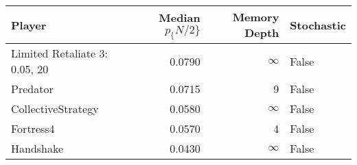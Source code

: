 \begin{tabular}{lrrl}
\toprule
                        Player &  Median $p_\{N/2\}$ &  Memory Depth & Stochastic \\
\midrule
 Limited Retaliate 3: 0.05, 20 &            0.0790 &            \(\infty\) &      False \\
                      Predator &            0.0715 &             9 &      False \\
            CollectiveStrategy &            0.0580 &            \(\infty\) &      False \\
                     Fortress4 &            0.0570 &             4 &      False \\
                     Handshake &            0.0430 &            \(\infty\) &      False \\
\bottomrule
\end{tabular}
